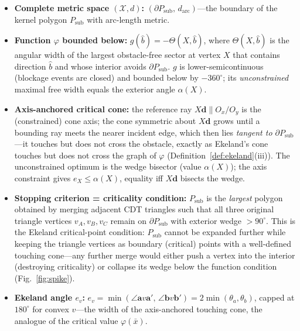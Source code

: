 \documentclass[10pt]{article}
\theoremstyle{plain}
\theoremstyle{definition}
\begin{document}
\begin{itemize}[leftmargin=*,topsep=2pt]
  \item \textbf{Complete metric space $(\mathcal{X},d)$:}
        $(\partial P_{\mathrm{sub}},\, d_{\mathrm{arc}})$---the boundary of
        the kernel polygon $P_{\mathrm{sub}}$ with arc-length metric.
  \item \textbf{Function $\varphi$ bounded below:}
        $g(\hat{b}) = -\Theta(X,\hat{b})$, where
        $\Theta(X,\hat{b})$ is the angular width of the largest obstacle-free
        sector at vertex $X$ that contains direction $\hat{b}$ and whose
        interior avoids $\partial P_{\mathrm{sub}}$.
        $g$ is lower-semicontinuous (blockage events are closed) and bounded
        below by $-360^\circ$; its \emph{unconstrained} maximal free width equals
        the exterior angle $\alpha(X)$.
  \item \textbf{Axis-anchored critical cone:}
        the reference ray $X\mathbf{d}\parallel O_x/O_y$ is the (constrained)
        cone axis; the cone symmetric about $X\mathbf{d}$ grows until a bounding
        ray meets the nearer incident edge, which then lies \emph{tangent to
        $\partial P_{\mathrm{sub}}$}---it touches but does not cross the obstacle,
        exactly as Ekeland's cone touches but does not cross the graph of
        $\varphi$ (Definition~\ref{def:ekeland}(iii)). The unconstrained optimum
        is the wedge bisector (value $\alpha(X)$); the axis constraint gives
        $e_X\le\alpha(X)$, equality iff $X\mathbf{d}$ bisects the wedge.
  \item \textbf{Stopping criterion = criticality condition:}
        $P_{\mathrm{sub}}$ is the \emph{largest} polygon obtained by merging
        adjacent CDT triangles such that all three original triangle vertices
        $v_A,v_B,v_C$ remain on $\partial P_{\mathrm{sub}}$ with exterior wedge
        ${>}90^\circ$.
        This is the Ekeland critical-point condition: $P_{\mathrm{sub}}$
        cannot be expanded further while keeping the triangle vertices as
        boundary (critical) points with a well-defined touching cone---any
        further merge would either push a vertex into the interior (destroying
        criticality) or collapse its wedge below the function condition
        (Fig.~\ref{fig:spike}).
  \item \textbf{Ekeland angle $e_v$:}
        $e_v=\min(\angle\mathbf{a}v\mathbf{a}',\,\angle\mathbf{b}v\mathbf{b}')
        =2\min(\theta_a,\theta_b)$, capped at $180^\circ$ for convex $v$---the
        width of the axis-anchored touching cone, the analogue of the critical
        value $\varphi(\bar{x})$.
\end{itemize}
\end{document}
